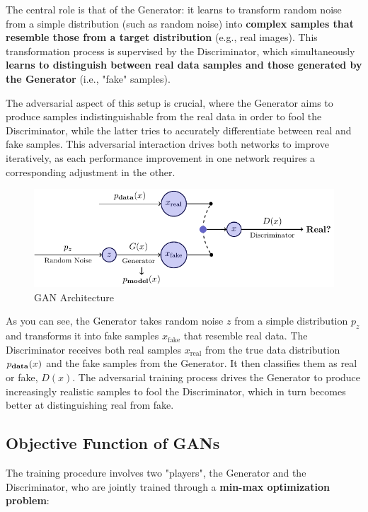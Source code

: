 The central role is that of the Generator: it learns to transform random noise from a simple distribution (such as random noise) into \textbf{complex samples that resemble those from a target distribution} (e.g., real images). This transformation process is supervised by the Discriminator, which simultaneously \textbf{learns to distinguish between real data samples and those generated by the Generator} (i.e., "fake" samples).

The adversarial aspect of this setup is crucial, where the Generator aims to produce samples indistinguishable from the real data in order to fool the Discriminator, while the latter tries to accurately differentiate between real and fake samples. This adversarial interaction drives both networks to improve iteratively, as each performance improvement in one network requires a corresponding adjustment in the other.

\newpage
\begin{figure}[!htbp]
    \centering
    \includegraphics[width=\linewidth]{tikz/chapter9 - Generative Adversarial Network.pdf}
    \caption{GAN Architecture}
\end{figure}

As you can see, the Generator takes random noise \(z\) from a simple distribution \(p_z\) and transforms it into fake samples \( x_{\text{fake}} \) that resemble real data. The Discriminator receives both real samples \( x_{\text{real}} \) from the true data distribution \( p_{\text{\textbf{data}}}(x) \) and the fake samples from the Generator. It then classifies them as real or fake, \( D(x) \). The adversarial training process drives the Generator to produce increasingly realistic samples to fool the Discriminator, which in turn becomes better at distinguishing real from fake.

\subsection{Objective Function of GANs}

The training procedure involves two "players", the Generator and the Discriminator, who are jointly trained through a \textbf{min-max optimization problem}:

